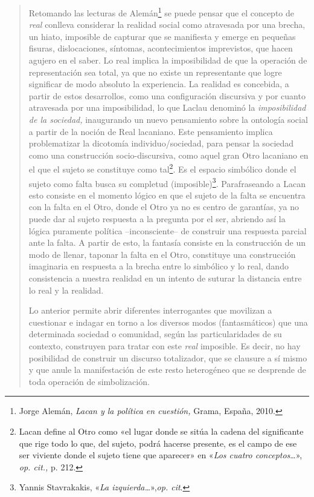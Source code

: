 \begin{quote}
Retomando las lecturas de Alemán\footnote{Jorge Alemán, \emph{Lacan y la política en cuestión,} Grama, España, 2010.} se puede pensar que el concepto de \emph{real} conlleva considerar la realidad social como atravesada por una brecha, un hiato, imposible de capturar que se manifiesta y emerge en pequeñas fisuras, dislocaciones, síntomas, acontecimientos imprevistos, que hacen agujero en el saber. Lo real implica la imposibilidad de que la operación de representación sea total, ya que no existe un representante que logre significar de modo absoluto la experiencia. La realidad es concebida, a partir de estos desarrollos, como una configuración discursiva y por cuanto atravesada por una imposibilidad, lo que Laclau denominó la \emph{imposibilidad de la sociedad,} inaugurando un nuevo pensamiento sobre la ontología social a partir de la noción de Real lacaniano. Este pensamiento implica problematizar la dicotomía individuo/sociedad, para pensar la sociedad como una construcción socio-discursiva, como aquel gran Otro lacaniano en el que el sujeto se constituye como tal\footnote{Lacan define al Otro como «el lugar donde se sitúa la cadena del significante que rige todo lo que, del sujeto, podrá hacerse presente, es el campo de ese ser viviente donde el sujeto tiene que aparecer» en «\emph{Los cuatro conceptos}\ldots», \emph{op. cit.,} p. 212.}. Es el espacio simbólico donde el sujeto como falta busca su completud (imposible)\footnote{Yannis Stavrakakis, «\emph{La izquierda\ldots{}}»,\emph{op. cit}.}. Parafraseando a Lacan esto consiste en el momento lógico en que el sujeto de la falta se encuentra con la falta en el Otro, donde el Otro ya no es centro de garantías, ya no puede dar al sujeto respuesta a la pregunta por el ser, abriendo así la lógica puramente política --inconsciente-- de construir una respuesta parcial ante la falta. A partir de esto, la fantasía consiste en la construcción de un modo de llenar, taponar la falta en el Otro, constituye una construcción imaginaria en respuesta a la brecha entre lo simbólico y lo real, dando consistencia a nuestra realidad en un intento de suturar la distancia entre lo real y la realidad.

Lo anterior permite abrir diferentes interrogantes que movilizan a cuestionar e indagar en torno a los diversos modos (fantasmáticos) que una determinada sociedad o comunidad, según las particularidades de su contexto, construyen para tratar con este \emph{real} imposible. Es decir, no hay posibilidad de construir un discurso totalizador, que se clausure a sí mismo y que anule la manifestación de este resto heterogéneo que se desprende de toda operación de simbolización.


\end{quote}
